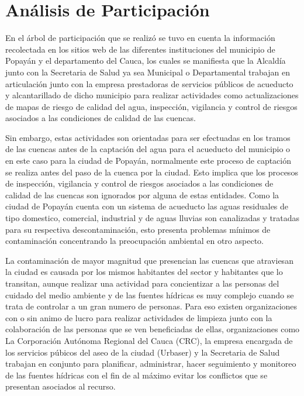 \section{Análisis de Participación}
  
  En el árbol de participación que se realizó se tuvo en cuenta la información recolectada en los sitios web de las diferentes instituciones del municipio de Popayán y el departamento del Cauca, los cuales se manifiesta que la Alcaldía junto con la Secretaria de Salud ya sea Municipal o Departamental trabajan en articulación junto con la empresa prestadoras de servicios públicos de acueducto y alcantarillado de dicho municipio para realizar actividades como actualizaciones de mapas de riesgo de calidad del agua, inspección, vigilancia y control de riesgos asociados a las condiciones de calidad de las cuencas. 

  Sin embargo, estas actividades son orientadas para ser efectuadas en los tramos de las cuencas antes de la captación del agua para el acueducto del municipio o en este caso para la ciudad de Popayán, normalmente este proceso de captación se realiza antes del paso de la cuenca por la ciudad. Esto implica que los procesos de inspección, vigilancia y control de riesgos asociados a las condiciones de calidad de las cuencas son ignorados por alguna de estas entidades. Como la ciudad de Popayán cuenta con un sistema de acueducto las aguas residuales de tipo domestico, comercial, industrial y de aguas lluvias son canalizadas y tratadas para su respectiva descontaminación, esto presenta problemas mínimos de contaminación concentrando la preocupación ambiental en otro aspecto.

  La contaminación de mayor magnitud que presencian las cuencas que atraviesan la ciudad es causada por los mismos habitantes del sector y habitantes que lo transitan, aunque realizar una actividad para concientizar a las personas del cuidado del medio ambiente y de las fuentes hídricas es muy complejo cuando se trata de controlar a un gran numero de personas. Para eso existen organizaciones con o sin animo de lucro para realizar actividades de limpieza junto con la colaboración de las personas que se ven beneficiadas de ellas, organizaciones como La Corporación Autónoma Regional del Cauca (CRC), la empresa encargada de los servicios púbicos del aseo de la ciudad (Urbaser) y la Secretaria de Salud trabajan en conjunto para planificar, administrar, hacer seguimiento y monitoreo de las fuentes hídricas con el fin de al máximo evitar los conflictos que se presentan asociados al recurso.

